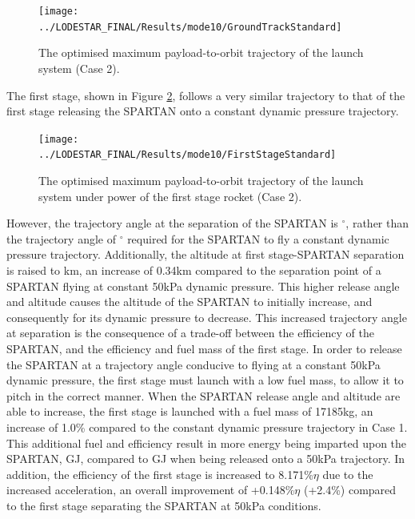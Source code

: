 \begin{figure}[ht!]
	
	
	
	\centering
	\texttt{[image: ../LODESTAR\_FINAL/Results/mode10/GroundTrackStandard]}
	\caption{The optimised maximum payload-to-orbit trajectory of the launch system (Case 2).}
	\label{fig:GroundTrackStandardNoReturn}
\end{figure}


The first stage, shown in Figure \ref{fig:FirstStageStandardNoReturn}, follows a very similar trajectory to that of the first stage releasing the SPARTAN onto a constant dynamic pressure trajectory.
\begin{figure}[ht!]
	\centering
	\texttt{[image: ../LODESTAR\_FINAL/Results/mode10/FirstStageStandard]}
	\caption{The optimised maximum payload-to-orbit trajectory of the launch system under power of the first stage rocket (Case 2).}
	\label{fig:FirstStageStandardNoReturn}
\end{figure}
 However, the trajectory angle at the separation of the SPARTAN is \secondthirdSeparationgammaqStandardNoReturn$^\circ$, rather than the trajectory angle of \secondthirdSeparationgammaConstqNoReturn$^\circ$ required for the SPARTAN to fly a constant dynamic pressure trajectory. Additionally, the altitude at first stage-SPARTAN separation is raised to \firstsecondSeparationAltStandardNoReturn km, an increase of 0.34km compared to the separation point of a SPARTAN flying at constant 50kPa dynamic pressure. This higher release angle and altitude causes the altitude of the SPARTAN to initially increase, and consequently for its dynamic pressure to decrease. This increased trajectory angle at separation is the consequence of a trade-off between the efficiency of the SPARTAN, and the efficiency and fuel mass of the first stage. 
 In order to release the SPARTAN at a trajectory angle conducive to flying at a constant 50kPa dynamic pressure, the first stage must launch with a low fuel mass, to allow it to pitch in the correct manner. When the SPARTAN release angle and altitude are able to increase, the first stage is launched with a fuel mass of 17185kg, an increase of 1.0\% compared to the constant dynamic pressure trajectory in Case 1. This additional fuel and efficiency result in more energy being imparted upon the SPARTAN, \firstdExergyStandardNoReturn GJ, compared to \firstdExergyConstqNoReturn GJ when being released onto a 50kPa trajectory. 
 In addition, the efficiency of the first stage is increased to 8.171\%$\eta$ due to the increased acceleration, an overall improvement of +0.148\%$\eta$ (+2.4\%) compared to the first stage separating the SPARTAN at 50kPa conditions. 
